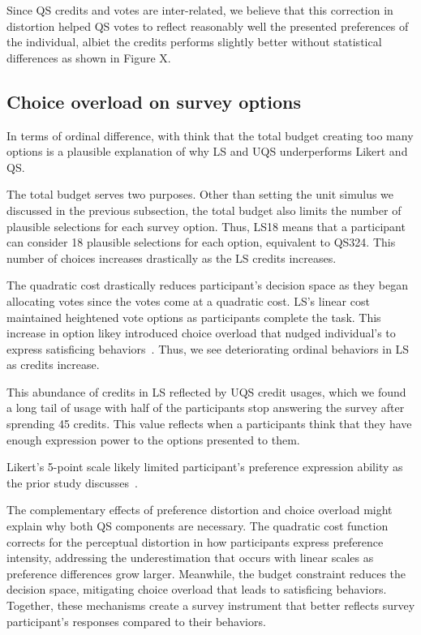 Since QS credits and votes are inter-related, we believe that this correction in distortion helped QS votes to reflect reasonably well the presented preferences of the individual, albiet the credits performs slightly better without statistical differences as shown in Figure X.

\subsection{Choice overload on survey options}
In terms of ordinal difference, with think that the total budget creating too many options is a plausible explanation of why LS and UQS underperforms Likert and QS.

The total budget serves two purposes. Other than setting the unit simulus we discussed in the previous subsection, the total budget also limits the number of plausible selections for each survey option. Thus, LS18 means that a participant can consider 18 plausible selections for each option, equivalent to QS324. This number of choices increases drastically as the LS credits increases.

The quadratic cost drastically reduces participant's decision space as they began allocating votes since the votes come at a quadratic cost. LS's linear cost maintained heightened vote options as participants complete the task. This increase in option likey introduced choice overload that nudged individual's to express satisficing behaviors~\cite{}. Thus, we see deteriorating ordinal behaviors in LS as credits increase.

This abundance of credits in LS reflected by UQS credit usages, which we found a long tail of usage with half of the participants stop answering the survey after sprending 45 credits. This value reflects when a participants think that they have enough expression power to the options presented to them.

Likert's 5-point scale likely limited participant's preference expression ability as the prior study discusses~\cite{chengCanShowWhat2021}.

The complementary effects of preference distortion and choice overload might explain why both QS components are necessary. The quadratic cost function corrects for the perceptual distortion in how participants express preference intensity, addressing the underestimation that occurs with linear scales as preference differences grow larger. Meanwhile, the budget constraint reduces the decision space, mitigating choice overload that leads to satisficing behaviors.  Together, these mechanisms create a survey instrument that better reflects survey participant's responses compared to their behaviors.


